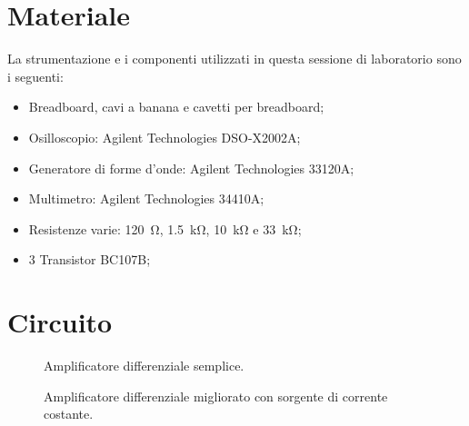 \section*{Materiale}

La strumentazione e i componenti utilizzati in questa sessione di laboratorio sono i seguenti:

\begin{itemize}
    \setlength{\itemsep}{0pt}
    \item{Breadboard, cavi a banana e cavetti per breadboard;}
    \item{Osilloscopio: Agilent Technologies DSO-X2002A;}
    \item{Generatore di forme d'onde: Agilent Technologies 33120A;}
    \item{Multimetro: Agilent Technologies 34410A;}
    \item{Resistenze varie: \SI{120}{\ohm}, \SI{1.5}{\kilo\ohm}, \SI{10}{\kilo\ohm} e \SI{33}{\kilo\ohm};}
    \item{3 Transistor BC107B;}
\end{itemize}

\section*{Circuito}

\begin{SCfigure}[1][h]
    \small
    \begin{subfigure}[t]{0.38\textwidth}
        \def\svgwidth{\columnwidth}
        
        \caption{Amplificatore differenziale semplice.}
        \label{fig:semplice}
    \end{subfigure}
    \caption{Circuiti costruiti durante l'esperienza. Le resistenze usate nel circuito \ref{fig:semplice} sono state:
        $R_C = R_1 = \SI{10}{\kilo\ohm}$ e $R_E = \SI{120}{\ohm}$.
        Nell'\ref{fig:complesso} si sono usate $R_C = \SI{10}{\kilo\ohm}$, $R_E = \SI{120}{\ohm}$,
        $R_1 = \SI{33}{\kilo\ohm}$, $R_2 = \SI{10}{\kilo\ohm}$ e $R_3 = \SI{1.5}{\kilo\ohm}$}
    \label{fig:circuiti}
    \begin{subfigure}[t]{0.38\textwidth}
        \def\svgwidth{\columnwidth}
        
        \caption{Amplificatore differenziale migliorato con sorgente di corrente costante.}
        \label{fig:complesso}
    \end{subfigure}
\end{SCfigure}
